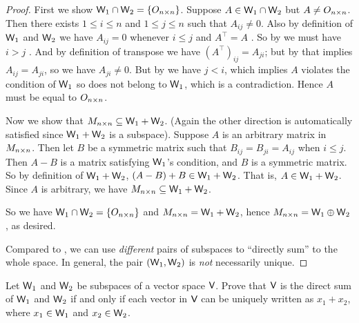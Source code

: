 \begin{proof}
First we show \(\textsf{W}_1 \cap \textsf{W}_2 = \{ O_{n \times n} \}\).
Suppose \(A \in \textsf{W}_1 \cap \textsf{W}_2\) but \(A \ne O_{n \times n}\).
Then there exists \(1 \le i \le n\) and \(1 \le j \le n\) such that \(A_{ij} \ne 0\).
Also by definition of \(\textsf{W}_1\) and \(\textsf{W}_2\) we have \(A_{ij} = 0\) whenever \(i \le j\)  and \(A^\top = A\) .
So by  we must have \(i > j\) .
And by definition of transpose we have \((A^\top)_{ij} = A_{ji}\);
but by  that implies \(A_{ij} = A_{ji}\), so we have \(A_{ji} \ne 0\).
But by  we have \(j < i\), which implies \(A\) violates the condition of \(\textsf{W}_1\) so does not belong to \(\textsf{W}_1\), which is a contradiction.
Hence \(A\) must be equal to \(O_{n \times n}\).

Now we show that \(M_{n \times n} \subseteq \textsf{W}_1 + \textsf{W}_2\).
(Again the other direction is automatically satisfied since \(\textsf{W}_1 + \textsf{W}_2\) is a subspace).
Suppose \(A\) is an arbitrary matrix in \(M_{n \times n}\).
Then let \(B\) be a symmetric matrix such that \(B_{ij} = B_{ji} = A_{ij}\) when \(i \le j\).
Then \(A - B\) is a matrix satisfying \(\textsf{W}_1\)'s condition, and \(B\) is a symmetric matrix.
So by definition of \(\textsf{W}_1 + \textsf{W}_2\), \((A - B) + B \in \textsf{W}_1 + \textsf{W}_2\).
That is, \(A \in \textsf{W}_1 + \textsf{W}_2\).
Since \(A\) is arbitrary, we have \(M_{n \times n} \subseteq \textsf{W}_1 + \textsf{W}_2\).

So we have \(\textsf{W}_1 \cap \textsf{W}_2 = \{ O_{n \times n} \}\) and \(M_{n \times n} = \textsf{W}_1 + \textsf{W}_2\), hence \(M_{n \times n} = \textsf{W}_1 \oplus \textsf{W}_2\), as desired.

Compared to , we can use \emph{different} pairs of subspaces to ``directly sum'' to the whole space.
In general, the pair \((\textsf{W}_1, \textsf{W}_2)\) is \emph{not} necessarily unique.
\end{proof}

\begin{exercise} \label{exercise 1.3.30}
Let \(\textsf{W}_1\) and \(\textsf{W}_2\) be subspaces of a vector space \(\textsf{V}\).
Prove that \(\textsf{V}\) is the direct sum of \(\textsf{W}_1\) and \(\textsf{W}_2\) if and only if each vector in \(\textsf{V}\) can be uniquely written as \(x_1 + x_2\), where \(x_1 \in \textsf{W}_1\) and \(x_2 \in \textsf{W}_2\).
\end{exercise}

